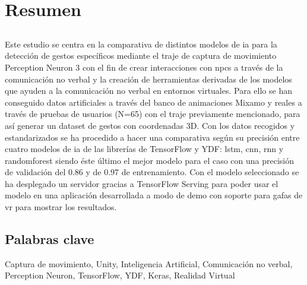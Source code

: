 \chapter*{Resumen}

\section*{\tituloPortadaVal}

Este estudio se centra en la comparativa de distintos modelos de \gls{ia} para la detección de gestos específicos mediante el traje de captura de movimiento Perception Neuron 3 con el fin de crear interacciones con \glspl{npc} a través de la comunicación no verbal y la creación de herramientas derivadas de los modelos que ayuden a la comunicación no verbal en entornos virtuales.
Para ello se han conseguido datos artificiales a través del banco de animaciones Mixamo y reales a través de pruebas de usuarios (N=65) con el traje previamente mencionado, para así generar un dataset de gestos con coordenadas 3D.
Con los datos recogidos y estandarizados se ha procedido a hacer una comparativa según su precisión entre cuatro modelos de \gls{ia} de las librerías de TensorFlow y YDF: \gls{lstm}, \gls{cnn}, \gls{rnn} y \gls{randomforest} siendo éste último el mejor modelo para el caso con una precisión de validación del 0.86 y de 0.97 de entrenamiento.
Con el modelo seleccionado se ha desplegado un servidor gracias a TensorFlow Serving para poder usar el modelo en una aplicación desarrollada a modo de demo con soporte para gafas de \gls{vr} para mostrar los resultados.


\section*{Palabras clave}

\noindent Captura de movimiento, Unity, Inteligencia Artificial, Comunicación no verbal, Perception Neuron, TensorFlow, YDF, Keras, Realidad Virtual





